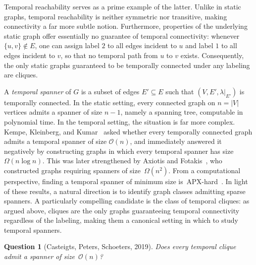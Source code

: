 \documentclass[11pt, letterpaper]{article}
\newcommand{\bigO}{\mathcal{O}}
\renewcommand{\subset}{\subseteq}
\theoremstyle{definition}
\theoremstyle{plain}
\newtheorem{question}[definition]{Question}
\begin{document}
Temporal reachability serves as a prime example of the latter.
Unlike in static graphs, temporal reachability is neither symmetric nor transitive, making connectivity a far more subtle notion.
Furthermore, properties of the underlying static graph offer essentially no guarantee of temporal connectivity: whenever $\{u,v\}\notin E$, one can assign label $2$ to all edges incident to $u$ and label $1$ to all edges incident to $v$, so that no temporal path from $u$ to $v$ exists.
Consequently, the only static graphs guaranteed to be temporally connected under any labeling are cliques.



A \emph{temporal spanner} of $G$ is a subset of edges $E'\subset E$ such that $(V,E',\lambda|_{E'})$ is temporally connected.
In the static setting, every connected graph on $n=|V|$ vertices admits a spanner of size $n-1$, namely a spanning tree, computable in polynomial time.
In the temporal setting, the situation is far more complex.
Kempe, Kleinberg, and Kumar~\cite{KempeKK00} asked whether every temporally connected graph admits a temporal spanner of size $\mathcal{O}(n)$, and immediately answered it negatively by constructing graphs in which every temporal spanner has size $\Omega(n\log n)$.
This was later strengthened by Axiotis and Fotakis~\cite{AxiotisF16}, who constructed graphs requiring spanners of size~$\Omega(n^2)$.
From a computational perspective, finding a temporal spanner of minimum size is~APX-hard~\cite{AxiotisF16}.
In light of these results, a natural direction is to identify graph classes admitting sparse spanners.
A particularly compelling candidate is the class of temporal cliques:
as argued above, cliques are the only graphs guaranteeing temporal connectivity regardless of the labeling, making them a canonical setting in which to study temporal spanners.

\begin{question}[Casteigts, Peters, Schoeters, 2019]
\label{question}
Does every temporal clique admit a spanner of size~$\bigO(n)$?
\end{question}
\end{document}
